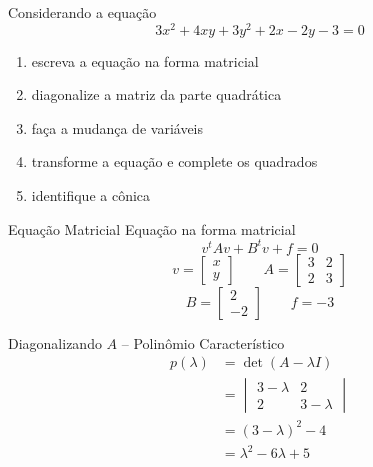 \begin{question}
  Considerando a equação
  \[
    3x^2+4xy+3y^2+2x-2y-3=0
  \]
  \vspace{-\baselineskip}
  \begin{enumerate}
    \item escreva a equação na forma matricial
    \item diagonalize a matriz da parte quadrática
    \item faça a mudança de variáveis
    \item transforme a equação e complete os quadrados
    \item identifique a cônica
  \end{enumerate}
\end{question}

\begin{resolution}{Equação Matricial}
  Equação na forma matricial
  \[
    v^tAv+B^tv+f=0
  \]
  \[
    v=\begin{bmatrix}x\\y\end{bmatrix}
    \qquad
    A=\begin{bmatrix}
      3&2\\
      2&3
    \end{bmatrix}
  \]
  \[
    B=\begin{bmatrix}2\\-2\end{bmatrix}
    \qquad
    f=-3
  \]
\end{resolution}

\begin{resolution}{Diagonalizando $A$ -- Polinômio Característico}
  \begin{align*}
    p(\lambda)
    & = \det(A-\lambda I)
    \\
    & = \begin{vmatrix}
      3-\lambda&2\\
      2&3-\lambda
    \end{vmatrix}
    \\
    & = (3-\lambda)^2-4
    \\
    & = \lambda^2-6\lambda+5
  \end{align*}
\end{resolution}

